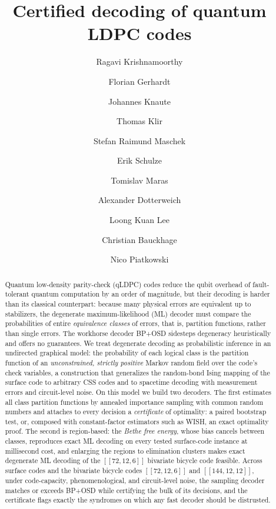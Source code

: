 \documentclass[a4paper,11pt]{quantumarticle}
\theoremstyle{definition}
\begin{document}
\title{Certified decoding of quantum LDPC codes}

\author{Ragavi Krishnamoorthy}
\author{Florian Gerhardt}
\author{Johannes Knaute}
\author{Thomas Klir}
\author{Stefan Raimund Maschek}
\author{Erik Schulze}
\author{Tomislav Maras}
\author{Alexander Dotterweich}
\author{Loong Kuan Lee}
\author{Christian Bauckhage}
\author{Nico Piatkowski}

\begin{abstract}
Quantum low-density parity-check (qLDPC) codes reduce the qubit overhead of
fault-tolerant quantum computation by an order of magnitude, but their
decoding is harder than its classical counterpart: because many physical
errors are equivalent up to stabilizers, the degenerate maximum-likelihood
(ML) decoder must compare the probabilities of entire \emph{equivalence
classes} of errors, that is, partition functions, rather than single errors. The
workhorse decoder BP+OSD sidesteps degeneracy heuristically and offers no
guarantees. We treat degenerate decoding as probabilistic inference in an
undirected graphical model: the probability of each logical class is the
partition function of an \emph{unconstrained, strictly positive} Markov
random field over the code's check variables, a construction that
generalizes the random-bond Ising mapping of the surface code to arbitrary
CSS codes and to spacetime decoding with measurement errors and
circuit-level noise. On this model we build two decoders. The first
estimates all class partition functions by annealed importance sampling
with common random numbers and attaches to every decision a
\emph{certificate} of optimality: a paired bootstrap test, or, composed
with constant-factor estimators such as WISH, an exact optimality proof.
The second is region-based: the \emph{Bethe free energy}, whose bias
cancels between classes, reproduces exact ML decoding on every tested
surface-code instance at millisecond cost, and enlarging the regions to
elimination clusters makes exact degenerate ML decoding of the
$[\![72,12,6]\!]$ bivariate bicycle code feasible. Across surface codes
and the bivariate bicycle codes $[\![72,12,6]\!]$ and
$[\![144,12,12]\!]$, under code-capacity, phenomenological, and
circuit-level noise, the sampling decoder matches or exceeds BP+OSD while
certifying the bulk of its decisions, and the certificate flags exactly
the syndromes on which any fast decoder should be distrusted.
\end{abstract}
\end{document}

